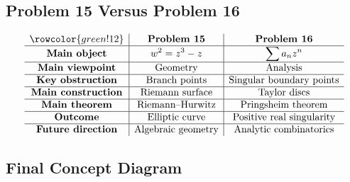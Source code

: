 \documentclass[12pt,a4paper]{article}
\theoremstyle{notespace}
\begin{document}
\subsection{Problem 15 Versus Problem 16}

\[
\begin{array}{c|c|c}
	\rowcolor{green!12}
	&
	\textbf{Problem 15}
	&
	\textbf{Problem 16}
	\\
	\hline
	\textbf{Main object}
	&
	\displaystyle w^2=z^3-z
	&
	\displaystyle \sum a_nz^n
	\\
	\hline
	\textbf{Main viewpoint}
	&
	\text{Geometry}
	&
	\text{Analysis}
	\\
	\hline
	\textbf{Key obstruction}
	&
	\text{Branch points}
	&
	\text{Singular boundary points}
	\\
	\hline
	\textbf{Main construction}
	&
	\text{Riemann surface}
	&
	\text{Taylor discs}
	\\
	\hline
	\textbf{Main theorem}
	&
	\text{Riemann--Hurwitz}
	&
	\text{Pringsheim theorem}
	\\
	\hline
	\textbf{Outcome}
	&
	\text{Elliptic curve}
	&
	\text{Positive real singularity}
	\\
	\hline
	\textbf{Future direction}
	&
	\text{Algebraic geometry}
	&
	\text{Analytic combinatorics}
\end{array}
\]

\subsection{Final Concept Diagram}
\end{document}
